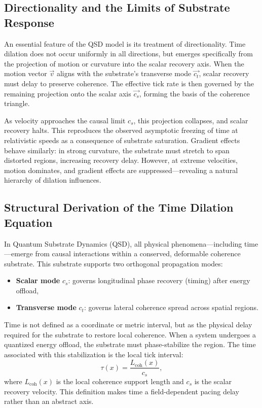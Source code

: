 \documentclass[entropy,article,submit,pdftex,moreauthors]{Definitions/mdpi}
\begin{document}
\subsection{Directionality and the Limits of Substrate Response}

An essential feature of the QSD model is its treatment of directionality. Time dilation does not occur uniformly in all directions, but emerges specifically from the projection of motion or curvature into the scalar recovery axis. When the motion vector \( \vec{v} \) aligns with the substrate’s transverse mode \( \vec{c_t} \), scalar recovery must delay to preserve coherence. The effective tick rate is then governed by the remaining projection onto the scalar axis \( \vec{c_s} \), forming the basis of the coherence triangle.

As velocity approaches the causal limit \( c_s \), this projection collapses, and scalar recovery halts. This reproduces the observed asymptotic freezing of time at relativistic speeds as a consequence of substrate saturation. Gradient effects behave similarly: in strong curvature, the substrate must stretch to span distorted regions, increasing recovery delay. However, at extreme velocities, motion dominates, and gradient effects are suppressed—revealing a natural hierarchy of dilation influences.

\subsection{Structural Derivation of the Time Dilation Equation}

In Quantum Substrate Dynamics (QSD), all physical phenomena—including time—emerge from causal interactions within a conserved, deformable coherence substrate. This substrate supports two orthogonal propagation modes:

\begin{itemize}
  \item \textbf{Scalar mode} \( c_s \): governs longitudinal phase recovery (timing) after energy offload,
  \item \textbf{Transverse mode} \( c_t \): governs lateral coherence spread across spatial regions.
\end{itemize}

Time is not defined as a coordinate or metric interval, but as the physical delay required for the substrate to restore local coherence. When a system undergoes a quantized energy offload, the substrate must phase-stabilize the region. The time associated with this stabilization is the local tick interval:
\begin{equation}
\tau(x) = \frac{L_{\text{coh}}(x)}{c_s},
\end{equation}
where \( L_{\text{coh}}(x) \) is the local coherence support length and \( c_s \) is the scalar recovery velocity. This definition makes time a field-dependent pacing delay rather than an abstract axis.
\end{document}
